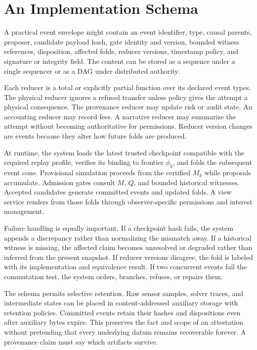 \documentclass[11pt]{article}
\begin{document}
\section{An Implementation Schema}

A practical event envelope might contain an event identifier, type, causal parents, proposer, candidate payload hash, gate identity and version, bounded witness references, disposition, affected folds, reducer versions, timestamp policy, and signature or integrity field. The content can be stored as a sequence under a single sequencer or as a DAG under distributed authority.

Each reducer is a total or explicitly partial function over its declared event types. The physical reducer ignores a refused transfer unless policy gives the attempt a physical consequence. The provenance reducer may update risk or audit state. An accounting reducer may record fees. A narrative reducer may summarize the attempt without becoming authoritative for permissions. Reducer version changes are events because they alter how future folds are produced.

At runtime, the system loads the latest trusted checkpoint compatible with the required replay profile, verifies its binding to frontier $\phi_k$, and folds the subsequent event cone. Provisional simulation proceeds from the certified $M_k$ while proposals accumulate. Admission gates consult $M$, $Q$, and bounded historical witnesses. Accepted candidates generate committed events and updated folds. A view service renders from those folds through observer-specific permissions and interest management.

Failure handling is equally important. If a checkpoint hash fails, the system appends a discrepancy rather than normalizing the mismatch away. If a historical witness is missing, the affected claim becomes unresolved or degraded rather than inferred from the present snapshot. If reducer versions disagree, the fold is labeled with its implementation and equivalence result. If two concurrent events fail the commutation test, the system orders, branches, refuses, or repairs them.

The schema permits selective retention. Raw sensor samples, solver traces, and intermediate states can be placed in content-addressed auxiliary storage with retention policies. Committed events retain their hashes and dispositions even after auxiliary bytes expire. This preserves the fact and scope of an attestation without pretending that every underlying datum remains recoverable forever. A provenance claim must say which artifacts survive.
\end{document}

